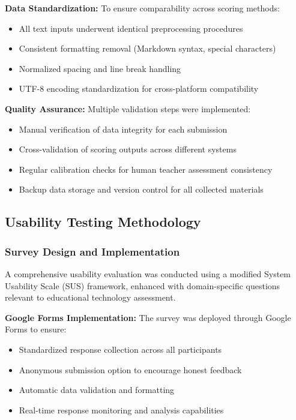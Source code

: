 \textbf{Data Standardization:} To ensure comparability across scoring methods:
\begin{itemize}
    \item All text inputs underwent identical preprocessing procedures
    \item Consistent formatting removal (Markdown syntax, special characters)
    \item Normalized spacing and line break handling
    \item UTF-8 encoding standardization for cross-platform compatibility
\end{itemize}

\textbf{Quality Assurance:} Multiple validation steps were implemented:
\begin{itemize}
    \item Manual verification of data integrity for each submission
    \item Cross-validation of scoring outputs across different systems
    \item Regular calibration checks for human teacher assessment consistency
    \item Backup data storage and version control for all collected materials
\end{itemize}

\subsection{Usability Testing Methodology}

\subsubsection{Survey Design and Implementation}

A comprehensive usability evaluation was conducted using a modified System Usability Scale (SUS) framework, enhanced with domain-specific questions relevant to educational technology assessment.

\textbf{Google Forms Implementation:} The survey was deployed through Google Forms to ensure:
\begin{itemize}
    \item Standardized response collection across all participants
    \item Anonymous submission option to encourage honest feedback
    \item Automatic data validation and formatting
    \item Real-time response monitoring and analysis capabilities
\end{itemize}

